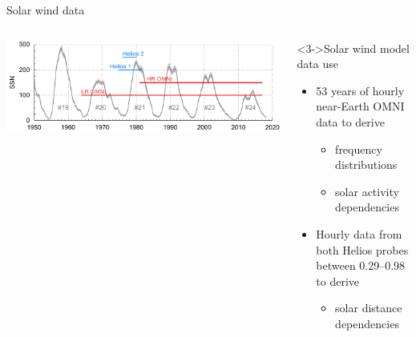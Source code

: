 \begin{frame}[plain,c]{Solar wind data}{}
\begin{columns}[c]
		\hspace*{-30pt}
		\includegraphics[width=1.2\textwidth]{../talk_figures/timeline_SSN_with_data_and_sc.pdf}
		\vspace{5mm}
		\begin{block}<3->{Solar wind model data use}
			\begin{itemize}
				\item 53 years of hourly near-Earth OMNI data to derive
				\begin{itemize}
					\item frequency distributions
					\item solar activity dependencies
				\end{itemize}
				\item Hourly data from both Helios probes between \SIrange{0.29}{0.98}{\au} to derive
				\begin{itemize}
					\item solar distance dependencies
				\end{itemize}
			\end{itemize}
		\end{block}
		
	\end{columns}
\end{frame}

